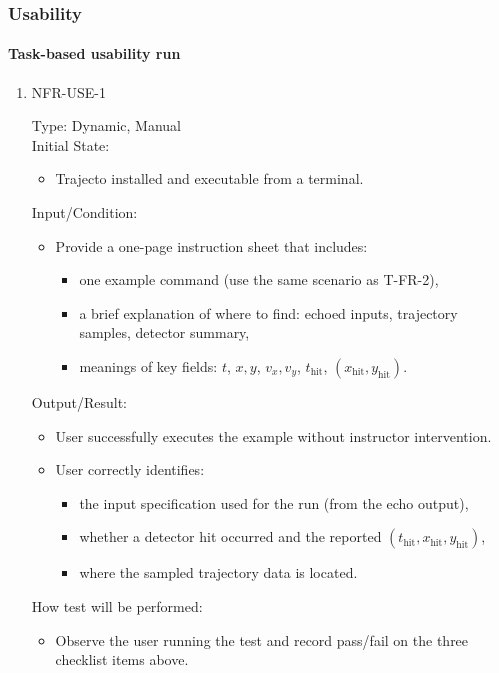 \documentclass[12pt, titlepage]{article}
\begin{document}
\subsubsection{Usability}

\paragraph{Task-based usability run}

\begin{enumerate}

\item{NFR-USE-1\\}

Type: Dynamic, Manual\\

Initial State:
\begin{itemize}
  \item Trajecto installed and executable from a terminal.
\end{itemize}

Input/Condition:
\begin{itemize}
  \item Provide a one-page instruction sheet that includes:
  \begin{itemize}
    \item one example command (use the same scenario as T-FR-2),
    \item a brief explanation of where to find: echoed inputs, trajectory samples, detector summary,
    \item meanings of key fields: $t$, $x,y$, $v_x,v_y$, $t_{\mathrm{hit}}$, $(x_{\mathrm{hit}},y_{\mathrm{hit}})$.
  \end{itemize}
\end{itemize}

Output/Result:
\begin{itemize}
  \item User successfully executes the example without instructor intervention.
  \item User correctly identifies:
  \begin{itemize}
    \item the input specification used for the run (from the echo output),
    \item whether a detector hit occurred and the reported $(t_{\mathrm{hit}},x_{\mathrm{hit}},y_{\mathrm{hit}})$,
    \item where the sampled trajectory data is located.
  \end{itemize}
\end{itemize}

How test will be performed:
\begin{itemize}
  \item Observe the user running the test and record pass/fail on the three checklist items above.
\end{itemize}

\end{enumerate}
\end{document}
